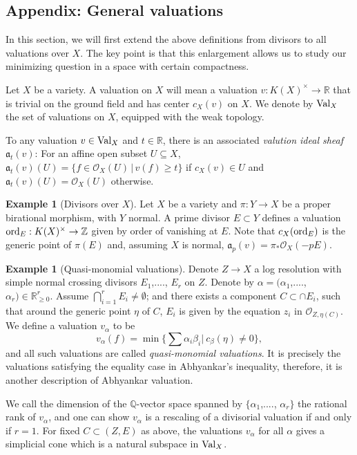 \documentclass[12pt,reqno]{amsart}%
\newcommand{\Z}{{\mathbb{Z} }}
\newcommand{\ord}{{\rm ord}}
\theoremstyle{definition}
\newtheorem{exmp}[thm]{Example}
\theoremstyle{remark}
\newcommand{\Val}{{\rm Val}}
\newcommand{\cO}{{\mathcal{O}}}
\newcommand{\fa}{{\mathfrak{a}}}
\newcommand{\R}{{\mathbb{R}}}
\begin{document}
\begin{subappendices}
\subsection{Appendix: General valuations}\label{ss-valuation}
In this section, we will first extend the above definitions from divisors to all valuations over $X$. The key point is that this enlargement allows us to study our minimizing question in a space with certain compactness.

\medskip

Let $X$ be a variety. A valuation on $X$ will mean a valuation $v: K(X)^\times \to \R$  that is trivial on the ground field and has center $c_X(v)$ on $X$. 
We denote by $\Val_{X}$ the set of valuations on $X$, equipped with the weak topology. 
 
To any valuation $v\in \Val_{X}$ and $t\in \mathbb{R}$, there is an associated \emph{valution ideal sheaf} 
$\fa_{t}(v)$: For an affine open subset $U\subseteq X$, $\fa_t(v)(U) = \{ f\in \cO_X(U) \, \vert \, v(f) \geq t \}$ if $c_X(v) \in U$ and $\fa_t(v) (U)= \cO_X(U)$ otherwise.



\begin{exmp}[Divisors over $X$]
Let $X$ be a variety and $\pi:Y \to X$ be a proper birational morphism, with $Y$ normal. 
A prime divisor $E \subset Y$ defines a valuation $\ord_E: K(X)^\times \to \Z$ given by order of vanishing at $E$. Note that $c_X(\ord_E)$ is the generic point of $\pi(E)$ and, assuming $X$ is normal, $\fa_p(v) = \pi_*\cO_X(-pE)$.  
\end{exmp}

\begin{exmp}[Quasi-monomial valuations]\label{e-quasi} Denote $Z\to X$ a log resolution with simple normal crossing divisors $E_1$,...., $E_r$ on $Z$. Denote by $\alpha=(\alpha_1$,...., $\alpha_r)\in \mathbb{R}^r_{\ge 0}$. Assume $\bigcap^r_{i=1} E_i\neq \emptyset$; and there exists a component $C\subset \cap E_i$, such that around the generic point $\eta$ of $C$, $E_i$ is given by the equation $z_i$ in $\mathcal{O}_{Z,\eta(C)}$.
We define a valuation $v_{\alpha}$ to be
$$v_{\alpha}(f)=\min \{\sum \alpha_i\beta_i|\ c_{\beta}(\eta)\neq 0\},$$
and all such valuations are called {\it quasi-monomial valuations}. It is precisely the valuations satisfying the equality case in Abhyankar's inequality, therefore, it is another description of Abhyankar valuation. 

We call the dimension of the $\mathbb{Q}$-vector space spanned by $\{\alpha_1$,...., $\alpha_r\}$ the rational rank of $v_{\alpha}$, and one can show $v_{\alpha}$ is a rescaling of a divisorial valuation if and only if $r=1$. For fixed $C\subset (Z,E)$ as above, the valuations $v_{\alpha}$ for all $\alpha$ gives a  simplicial cone which is a natural subspace in $\Val_{X}$. 
\end{exmp}


\end{subappendices}
\end{document}
